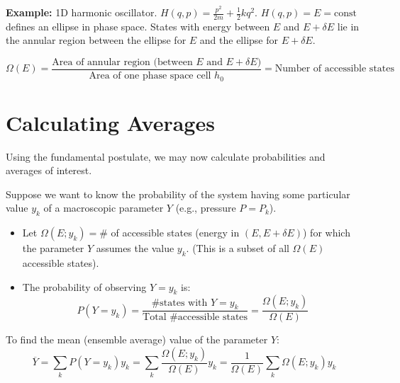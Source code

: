 \documentclass[11pt]{article}
\newcommand{\avg}[1]{\overline{#1}}
\begin{document}
\textbf{Example:} 1D harmonic oscillator.
$H(q,p) = \frac{p^2}{2m} + \frac{1}{2} k q^2$.
$H(q,p) = E = \text{const}$ defines an ellipse in phase space.
States with energy between $E$ and $E+\delta E$ lie in the annular region between the ellipse for $E$ and the ellipse for $E+\delta E$.

\begin{center}
\end{center}
$$
\Omega(E) = \frac{\text{Area of annular region (between } E \text{ and } E+\delta E)}
{\text{Area of one phase space cell } h_0} = \text{Number of accessible states}
$$

\section*{Calculating Averages}

Using the fundamental postulate, we may now calculate probabilities and averages of interest.

Suppose we want to know the probability of the system having some particular value $y_k$ of a macroscopic parameter $Y$ (e.g., pressure $P=P_k$).
\begin{itemize}
    \item Let $\Omega(E; y_k) = \#$ of accessible states (energy in $(E, E+\delta E)$) for which the parameter $Y$ assumes the value $y_k$. (This is a subset of all $\Omega(E)$ accessible states).
    \item The probability of observing $Y=y_k$ is:
    \[ P(Y=y_k) = \frac{\text{\# states with } Y=y_k}{\text{Total \# accessible states}} = \frac{\Omega(E; y_k)}{\Omega(E)} \]
\end{itemize}
To find the mean (ensemble average) value of the parameter $Y$:
\[ \avg{Y} = \sum_k P(Y=y_k) y_k = \sum_k \frac{\Omega(E; y_k)}{\Omega(E)} y_k = \frac{1}{\Omega(E)} \sum_k \Omega(E; y_k) y_k \]
\end{document}
